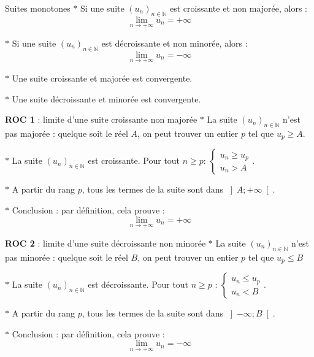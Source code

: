 \newpage

\begin{bclogo}{Suites monotones}
$\ast$ Si une suite $(u_n)_{n\in\mathbb{N}}$ est croissante et non majorée, alors : \[\lim\limits_{n \to +\infty} u_n=+\infty\]

\noindent
$\ast$ Si une suite $(u_n)_{n\in\mathbb{N}}$ est décroissante et non minorée, alors : \[\lim\limits_{n \to +\infty} u_n=-\infty\]

\noindent
$\ast$ Une suite croissante et majorée est convergente.

\noindent
$\ast$ Une suite décroissante et minorée est convergente.
\end{bclogo}
\medskip

\begin{bclogo}{\textbf{ROC 1} : limite d'une suite croissante non majorée}
$\ast$ La suite $(u_n)_{n\in\mathbb{N}}$ n'est pas majorée : quelque soit le réel $A$, on peut trouver un entier $p$ tel que $u_p\geqslant A$.

\noindent
$\ast$ La suite $(u_n)_{n\in\mathbb{N}}$ est croissante. Pour tout $n\geqslant p$: $\left\lbrace\begin{array}{l} u_n\geqslant u_p \\ u_n > A\end{array}\right.$.

\noindent
$\ast$ A partir du rang $p$, tous les termes de la suite sont dans $\left] A;+\infty \right[$.

\noindent
$\ast$ Conclusion : par définition, cela prouve : \[\boxed{\lim\limits_{n \to +\infty} u_n=+\infty}\]
\end{bclogo}

\medskip

\begin{bclogo}{\textbf{ROC 2} : limite d'une suite décroissante non minorée}
$\ast$ La suite $(u_n)_{n\in\mathbb{N}}$ n'est pas minorée : quelque soit le réel $B$, on peut trouver un entier $p$ tel que $u_p\leqslant B$ 

\noindent
$\ast$ La suite $(u_n)_{n\in\mathbb{N}}$ est décroissante. Pour tout $n\geqslant p$ : $\left\lbrace\begin{array}{l} u_n\leqslant u_p \\ u_n < B\end{array}\right.$.

\noindent
$\ast$ A partir du rang $p$, tous les termes de la suite sont dans $\left] -\infty ;B \right[$.

\noindent
$\ast$ Conclusion : par définition, cela prouve : \[\boxed{\lim\limits_{n \to +\infty} u_n=-\infty}\]
\end{bclogo}

